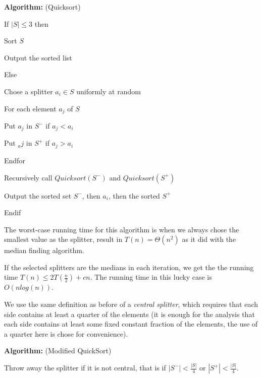 \documentclass{proc}
\begin{document}
\begin{mdframed}
    \textbf{Algorithm:} (Quicksort)
    
    If $|S| \le 3$ then
    
    \hspace{2ex} Sort $S$
    
    \hspace{2ex} Output the sorted list
    
    Else
    
    \hspace{2ex} Chose a splitter $a_i \in S$ uniformly at random
    
    \hspace{2ex} For each element $a_j$ of $S$
    
    \hspace{2ex} \hspace{2ex} Put $a_j$ in $S^-$ if $a_j < a_i$
    
    \hspace{2ex} \hspace{2ex} Put $_aj$ in $S^+$ if $a_j > a_i$
    
    \hspace{2ex} Endfor
    
    \hspace{2ex} Recursively call $Quicksort(S^-)$ and $Quicksort(S^+)$
    
    \hspace{2ex} Output the sorted set $S^-$, then $a_i$, then the sorted $S^+$
    
    Endif
\end{mdframed}

The worst-case running time for this algorithm is when we always chose the smallest value as the splitter, result in $T(n) = \Theta(n^2)$ as it did with the median finding algorithm.

If the selected splitters are the medians in each iteration, we get the the running time $T(n) \le 2T(\frac{n}{2}) + cn$. The running time in this lucky case is $O(nlog(n))$.

We use the same definition as before of a \textit{central splitter}, which requires that each side contains at least a quarter of the elements (it is enough for the analysis that each side contains at least some fixed constant fraction of the elements, the use of a quarter here is chose for convenience).

\begin{mdframed}
    \textbf{Algorithm:} (Modified QuickSort)
    
    Throw away the splitter if it is not central, that is if $|S^-| < \frac{|S|}{4}$ or $|S^+| < \frac{|S|}{4}$.
\end{mdframed}
\end{document}
